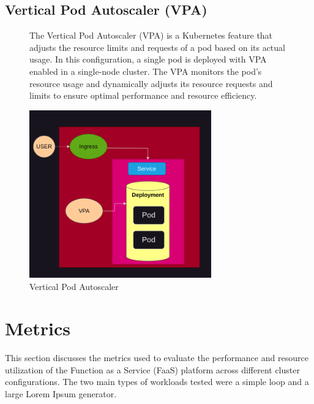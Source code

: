 \documentclass{article}
\begin{document}
\subsection{Vertical Pod Autoscaler (VPA)}
\nobreak
\vspace{-30px}
\begin{figure}[h]
    \begin{minipage}[t]{0.6\textwidth}
        \vspace{-120px}
        The Vertical Pod Autoscaler (VPA) is a Kubernetes feature that adjusts the
        resource limits and requests of a pod based on its actual usage. In this
        configuration, a single pod is deployed with VPA enabled in a single-node
        cluster. The VPA monitors the pod's resource usage and dynamically adjusts its
        resource requests and limits to ensure optimal performance and resource
        efficiency.
    \end{minipage}%
    \hfill
    \begin{minipage}[b]{0.4\textwidth}
        \centering
        \includegraphics[width=0.7\textwidth]{../images/vpa.png}
        \caption{Vertical Pod Autoscaler}
        \label{fig:vpa}
    \end{minipage}
\end{figure}


\section{Metrics}
This section discusses the metrics used to evaluate the performance and resource utilization of the Function as a Service (FaaS) platform across different cluster configurations. The two main types of workloads tested were a simple loop and a large Lorem Ipsum generator.
\end{document}
